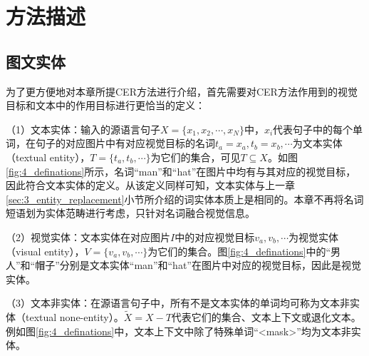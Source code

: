 \section{方法描述}

\subsection{图文实体}
\label{sec:4_entities}

为了更方便地对本章所提CER方法进行介绍，首先需要对CER方法作用到的视觉目标和文本中的作用目标进行更恰当的定义：

（1）{\sffamily 文本实体：}输入的源语言句子$X=\{x_1,x_2,\cdots,x_N\}$中，$x_i$代表句子中的每个单词，在句子的对应图片中有对应视觉目标的名词$t_a=x_a,t_b=x_b,\cdots$为文本实体（textual entity），$T=\{t_a,t_b,\cdots\}$为它们的集合，可见$T \subseteq X$。如图\ref{fig:4_definations}所示，名词“man”和“hat”在图片中均有与其对应的视觉目标，因此符合文本实体的定义。从该定义同样可知，文本实体与上一章\ref{sec:3_entity_replacement}小节所介绍的词实体本质上是相同的。本章不再将名词短语划为实体范畴进行考虑，只针对名词融合视觉信息。

（2）{\sffamily 视觉实体：}文本实体在对应图片$I$中的对应视觉目标$v_a,v_b,\cdots$为视觉实体（visual entity），$V=\{v_a,v_b,\cdots\}$为它们的集合。图\ref{fig:4_definations}中的“男人”和“帽子”分别是文本实体“man”和“hat”在图片中对应的视觉目标，因此是视觉实体。

（3）{\sffamily 文本非实体：}在源语言句子中，所有不是文本实体的单词均可称为文本非实体（textual none-entity）。$\tilde{X}=X-T$代表它们的集合、文本上下文或退化文本。例如图\ref{fig:4_definations}中，文本上下文中除了特殊单词“<mask>”均为文本非实体。

%

%

